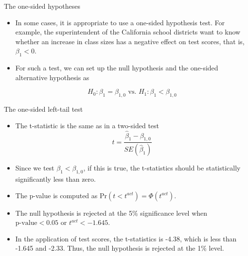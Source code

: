 \documentclass[presentation]{beamer}
\begin{document}
\begin{frame}[label={sec:org258748f}]{The one-sided hypotheses}
\begin{itemize}
\item In some cases, it is appropriate to use a one-sided hypothesis
test. For example, the superintendent of the California school
districts want to know whether an increase in class sizes has a
negative effect on test scores, that is, \(\beta_1 < 0\).

\item For such a test, we can set up the null hypothesis and the one-sided
alternative hypothesis as

\[ H_0: \beta_1 = \beta_{1,0} \text{ vs. } H_1: \beta_1 < \beta_{1,0} \]
\end{itemize}
\end{frame}

\begin{frame}[label={sec:org783e35d}]{The one-sided left-tail test}
\begin{itemize}
\item The t-statistic is the same as in a two-sided test
\[ t = \frac{\hat{\beta}_1 - \beta_{1,0}}{SE(\hat{\beta}_1)} \]

\item Since we test \(\beta_1 < \beta_{1,0}\), if this is true, the
t-statistics should be statistically significantly less than zero.

\item The p-value is computed as \(\mathrm{Pr}(t < t^{act}) = \Phi(t^{act})\).

\item The null hypothesis is rejected at the 5\% significance level when
\(\text{p-value} < 0.05\) or \(t^{act} < -1.645\).

\item In the application of test scores, the t-statistics is -4.38, which
is less than -1.645 and -2.33. Thus, the null hypothesis is rejected
at the 1\% level.
\end{itemize}
\end{frame}
\end{document}
